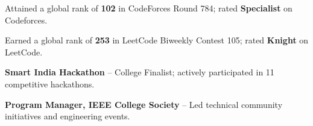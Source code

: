 \begin{itemize}[leftmargin=0.12in, itemsep=2.5pt, topsep=1pt]
  \small{
    \item Attained a global rank of \textbf{102} in CodeForces Round 784; rated \textbf{Specialist} on Codeforces.
    \item Earned a global rank of \textbf{253} in LeetCode Biweekly Contest 105; rated \textbf{Knight} on LeetCode.
    \item \textbf{Smart India Hackathon} -- College Finalist; actively participated in 11 competitive hackathons.
    \item \textbf{Program Manager, IEEE College Society} -- Led technical community initiatives and engineering events.
  }
\end{itemize}